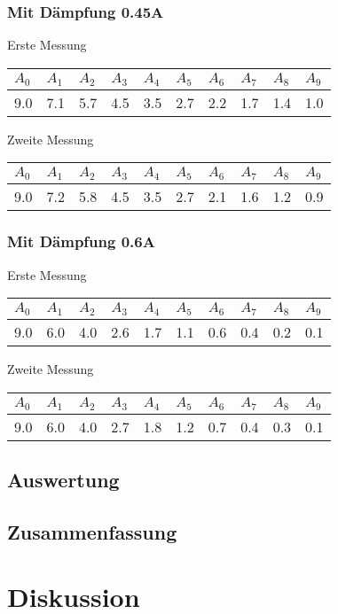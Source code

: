 \documentclass[12pt,a4paper]{article}
\begin{document}
\subsubsection*{Mit D\"ampfung 0.45A}
Erste Messung

\vspace{3pt}
\begin{tabular}{|l|l|l|l|l|l|l|l|l|l|}
\hline
$A_{0}$&$A_{1}$&$A_{2}$&$A_{3}$&$A_{4}$&$A_{5}$&$A_{6}$&$A_{7}$&$A_{8}$&$A_{9}$\\
\hline
9.0&7.1&5.7&4.5&3.5&2.7&2.2&1.7&1.4&1.0\\
\hline
\end{tabular}
\vspace{10pt}

Zweite Messung

\vspace{3pt}
\begin{tabular}{|l|l|l|l|l|l|l|l|l|l|}
\hline
$A_{0}$&$A_{1}$&$A_{2}$&$A_{3}$&$A_{4}$&$A_{5}$&$A_{6}$&$A_{7}$&$A_{8}$&$A_{9}$\\
\hline
9.0&7.2&5.8&4.5&3.5&2.7&2.1&1.6&1.2&0.9\\
\hline
\end{tabular}

\subsubsection*{Mit D\"ampfung 0.6A}
Erste Messung

\begin{tabular}{|l|l|l|l|l|l|l|l|l|l|}
\hline
$A_{0}$&$A_{1}$&$A_{2}$&$A_{3}$&$A_{4}$&$A_{5}$&$A_{6}$&$A_{7}$&$A_{8}$&$A_{9}$\\
\hline
9.0&6.0&4.0&2.6&1.7&1.1&0.6&0.4&0.2&0.1\\
\hline
\end{tabular}
\vspace{10pt}

Zweite Messung

\vspace{3pt}
\begin{tabular}{|l|l|l|l|l|l|l|l|l|l|}
\hline
$A_{0}$&$A_{1}$&$A_{2}$&$A_{3}$&$A_{4}$&$A_{5}$&$A_{6}$&$A_{7}$&$A_{8}$&$A_{9}$\\
\hline
9.0&6.0&4.0&2.7&1.8&1.2&0.7&0.4&0.3&0.1\\
\hline
\end{tabular}

\subsection*{Auswertung}

\subsection*{Zusammenfassung}


\section*{Diskussion}
\end{document}
